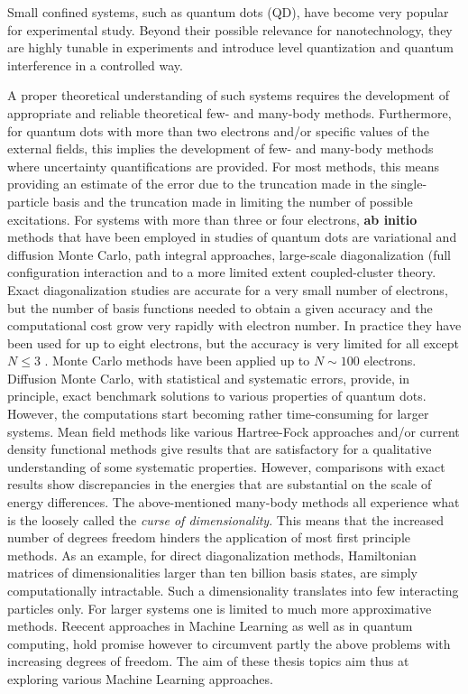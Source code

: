 \documentclass[%
oneside,                 %
final,                   %
10pt]{article}
\begin{document}
Small confined systems, such as quantum dots (QD), have become very
popular for experimental study.  Beyond their possible relevance for
nanotechnology, they are highly tunable in experiments and introduce
level quantization and quantum interference in a controlled way.



A proper theoretical understanding of such systems requires the
development of appropriate and reliable theoretical few- and many-body
methods.  Furthermore, for quantum dots with more than two electrons
and/or specific values of the external fields, this implies the
development of few- and many-body methods where uncertainty
quantifications are provided.  For most methods, this means providing
an estimate of the error due to the truncation made in the
single-particle basis and the truncation made in limiting the number
of possible excitations.  For systems with more than three or four
electrons, \textbf{ab initio} methods that have been employed in studies of
quantum dots are variational and diffusion Monte Carlo, path integral
approaches, large-scale diagonalization (full configuration
interaction and to a more limited extent coupled-cluster theory.
Exact diagonalization studies are accurate for a very small number of
electrons, but the number of basis functions needed to obtain a given
accuracy and the computational cost grow very rapidly with electron
number.  In practice they have been used for up to eight electrons,
but the accuracy is very limited for all except $N\le 3$ .  Monte
Carlo methods have been applied up to $N\sim 100$ electrons. Diffusion
Monte Carlo, with statistical and systematic errors, provide, in
principle, exact benchmark solutions to various properties of quantum
dots. However, the computations start becoming rather time-consuming
for larger systems.  Mean field methods like various Hartree-Fock
approaches and/or current density functional methods give results that
are satisfactory for a qualitative understanding of some systematic
properties. However, comparisons with exact results show discrepancies
in the energies that are substantial on the scale of energy
differences. The above-mentioned many-body methods all experience what
is the loosely called the \emph{curse of dimensionality}. This means that
the increased number of degrees freedom hinders the application of
most first principle methods. As an example, for direct
diagonalization methods, Hamiltonian matrices of dimensionalities
larger than ten billion basis states, are simply computationally
intractable. Such a dimensionality translates into few interacting
particles only. For larger systems one is limited to much more
approximative methods.  Reecent approaches in Machine Learning as well
as in quantum computing, hold promise however to circumvent partly the
above problems with increasing degrees of freedom.  The aim of these
thesis topics aim thus at exploring various Machine Learning
approaches.
\end{document}
